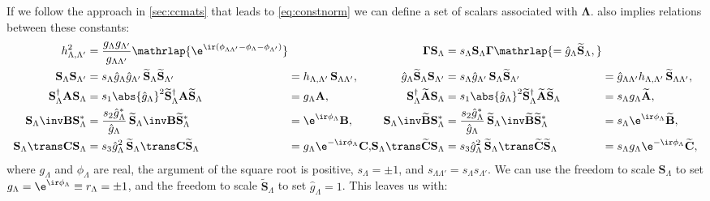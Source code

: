 \documentclass[11pt]{article}
\newcommand{\Gammab}{\boldsymbol{\Gamma}}
\renewcommand{\S}{\mathbf{S}}
\newcommand{\A}{\mathbf{A}}
\newcommand{\B}{\mathbf{B}}
\renewcommand{\C}{\mathbf{C}}
\newcommand{\At}{\widetilde{\A}}
\newcommand{\Bt}{\widetilde{\B}}
\newcommand{\Ct}{\widetilde{\C}}
\newcommand{\St}{\widetilde{\S}}
\newcommand{\Lambdab}{\boldsymbol{\Lambda}}
\begin{document}
If we follow the approach in \cref{sec:ccmats} that leads to \cref{eq:constnorm} we can define a set of scalars associated with \(\Lambdab\).
 also implies relations between these constants:
%
\begin{equation*}
\begin{alignedat}{4}
  h_{\Lambda,\Lambda'}^2 &= \frac{g_{\Lambda}g_{\Lambda'}}{g_{\Lambda\Lambda'}}
    \mathrlap{\e^{\ir(\phi_{\Lambda\Lambda'} - \phi_\Lambda - \phi_{\Lambda'})}} &&&
  \Gammab \S_\Lambda
    &= s_\Lambda \S_\Lambda \Gammab 
    \mathrlap{= \hat{g}_\Lambda \St_\Lambda,} \\
  \S_\Lambda \S_{\Lambda'} 
    &= s_{\Lambda} \hat{g}_\Lambda \hat{g}_{\Lambda'}\, \St_\Lambda \St_{\Lambda'} &
    &= h_{\Lambda,\Lambda'}\, \S_{\Lambda\Lambda'}, &\qquad
  \hat{g}_{\Lambda} \St_\Lambda \S_{\Lambda'} 
    &= s_{\Lambda} \hat{g}_{\Lambda'}\, \S_\Lambda \St_{\Lambda'} &
    &= \hat{g}_{\Lambda\Lambda'}h_{\Lambda,\Lambda'}\, \St_{\Lambda\Lambda'}, \\ 
  \S_\Lambda^\dag \A \S_\Lambda
    &= s_1 \abs{\hat{g}_\Lambda}^2 \St_\Lambda^\dag \A \St_\Lambda &
    &= g_\Lambda \A, &
  \S_\Lambda^\dag \At \S_\Lambda
    &= s_1 \abs{\hat{g}_\Lambda}^2 \St_\Lambda^\dag \At \St_\Lambda &
    &= s_\Lambda g_\Lambda \At, \\
  \S_\Lambda\inv \B \S_\Lambda^\ast
    &= \frac{s_2 \hat{g}_\Lambda^\ast}{\hat{g}_\Lambda} \,
      \St_\Lambda\inv \B \St_\Lambda^\ast &
    &= \e^{\ir\phi_\Lambda} \B, &
  \S_\Lambda\inv \Bt \S_\Lambda^\ast
    &= \frac{s_2 \hat{g}_\Lambda^\ast}{\hat{g}_\Lambda} \,
      \St_\Lambda\inv \Bt \St_\Lambda^\ast &
    &= s_\Lambda \e^{\ir\phi_\Lambda} \Bt, \\
  \S_\Lambda\trans \C \S_\Lambda
    &= s_3 \hat{g}_\Lambda^2\, \St_\Lambda\trans \C \St_\Lambda &
    &= g_\Lambda \e^{-\ir\phi_\Lambda} \C, &
  \S_\Lambda\trans \Ct \S_\Lambda 
    &= s_3 \hat{g}_\Lambda^2\, \St_\Lambda\trans \Ct \St_\Lambda &
    &= s_\Lambda g_\Lambda \e^{-\ir\phi_\Lambda} \Ct,
\end{alignedat}
\end{equation*}
%
where \(g_\Lambda\) and \(\phi_\Lambda\) are real, the argument of the square root is positive, \(s_\Lambda = \pm 1\), and \(s_{\Lambda\Lambda'} = s_{\Lambda} s_{\Lambda'}\).
We can use the freedom to scale \(\S_\Lambda\) to set \(g_\Lambda = \e^{\ir\phi_\Lambda} \equiv r_\Lambda = \pm 1\),
and the freedom to scale \(\St_\Lambda\) to set \(\hat{g}_\Lambda = 1\).
This leaves us with:
%
\end{document}

